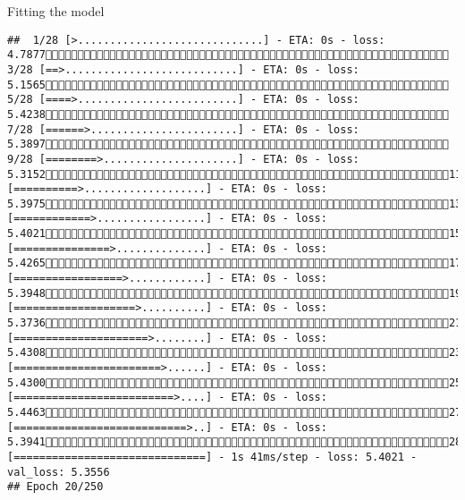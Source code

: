 \documentclass[
  ignorenonframetext,
]{beamer}
\begin{document}
\begin{frame}[fragile]{Fitting the model}
\begin{verbatim}
##  1/28 [>.............................] - ETA: 0s - loss: 4.7877 3/28 [==>...........................] - ETA: 0s - loss: 5.1565 5/28 [====>.........................] - ETA: 0s - loss: 5.4238 7/28 [======>.......................] - ETA: 0s - loss: 5.3897 9/28 [========>.....................] - ETA: 0s - loss: 5.315211/28 [==========>...................] - ETA: 0s - loss: 5.397513/28 [============>.................] - ETA: 0s - loss: 5.402115/28 [===============>..............] - ETA: 0s - loss: 5.426517/28 [=================>............] - ETA: 0s - loss: 5.394819/28 [===================>..........] - ETA: 0s - loss: 5.373621/28 [=====================>........] - ETA: 0s - loss: 5.430823/28 [=======================>......] - ETA: 0s - loss: 5.430025/28 [=========================>....] - ETA: 0s - loss: 5.446327/28 [===========================>..] - ETA: 0s - loss: 5.394128/28 [==============================] - 1s 41ms/step - loss: 5.4021 - val_loss: 5.3556
## Epoch 20/250

\end{verbatim}
\end{frame}
\end{document}
